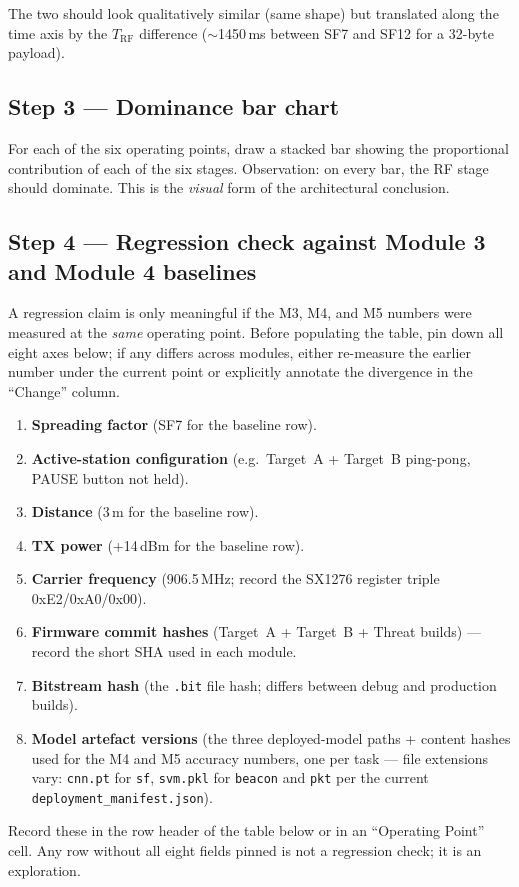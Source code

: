 \documentclass[11pt,letterpaper]{article}
\begin{document}
The two should look qualitatively similar (same shape) but translated along the time axis by the $T_{\text{RF}}$ difference ($\sim$1450\,ms between SF7 and SF12 for a 32-byte payload).

\subsection{Step 3 --- Dominance bar chart}
For each of the six operating points, draw a stacked bar showing the proportional contribution of each of the six stages. Observation: on every bar, the \mbox{RF} stage should dominate. This is the \emph{visual} form of the architectural conclusion.

\subsection{Step 4 --- Regression check against Module 3 and Module 4 baselines}

\begin{tcolorbox}[warning={Comparability Rules --- Required Normalization}]
A regression claim is only meaningful if the M3, M4, and M5 numbers were measured at the \emph{same} operating point. Before populating the table, pin down all eight axes below; if any differs across modules, either re-measure the earlier number under the current point or explicitly annotate the divergence in the ``Change'' column.
\begin{enumerate}[leftmargin=1.2em]
	\item \textbf{Spreading factor} (SF7 for the baseline row).
	\item \textbf{Active-station configuration} (e.g.\ Target~A + Target~B ping-pong, PAUSE button not held).
	\item \textbf{Distance} (3\,m for the baseline row).
	\item \textbf{TX power} (+14\,dBm for the baseline row).
	\item \textbf{Carrier frequency} (906.5\,MHz; record the SX1276 register triple 0xE2/0xA0/0x00).
	\item \textbf{Firmware commit hashes} (Target~A + Target~B + Threat builds) --- record the short SHA used in each module.
	\item \textbf{Bitstream hash} (the \texttt{.bit} file hash; differs between debug and production builds).
	\item \textbf{Model artefact versions} (the three deployed-model paths + content hashes used for the M4 and M5 accuracy numbers, one per task --- file extensions vary: \texttt{cnn.pt} for \texttt{sf}, \texttt{svm.pkl} for \texttt{beacon} and \texttt{pkt} per the current \texttt{deployment\_manifest.json}).
\end{enumerate}
Record these in the row header of the table below or in an ``Operating Point'' cell. Any row without all eight fields pinned is not a regression check; it is an exploration.
\end{tcolorbox}
\end{document}
